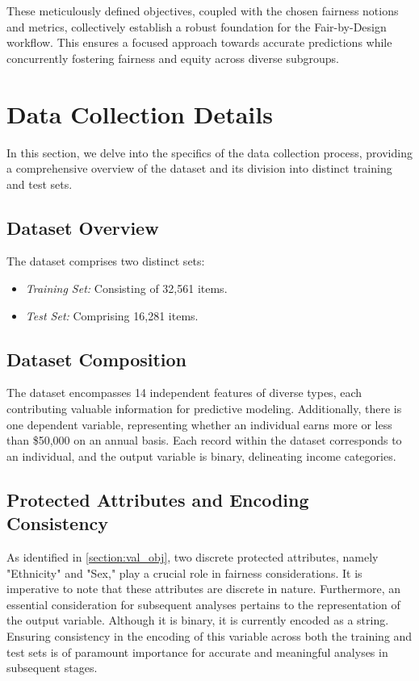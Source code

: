These meticulously defined objectives, coupled with the chosen fairness notions and metrics, collectively establish a robust foundation for the Fair-by-Design workflow. This ensures a focused approach towards accurate predictions while concurrently fostering fairness and equity across diverse subgroups.

\section{Data Collection Details}
\label{section:val_dc}

In this section, we delve into the specifics of the data collection process, providing a comprehensive overview of the dataset and its division into distinct training and test sets.

\subsection{Dataset Overview}

The dataset comprises two distinct sets:

\begin{itemize}
    \item \emph{Training Set:} Consisting of 32,561 items.
    \item \emph{Test Set:} Comprising 16,281 items.
\end{itemize}

\subsection{Dataset Composition}

The dataset encompasses 14 independent features of diverse types, each contributing valuable information for predictive modeling. Additionally, there is one dependent variable, representing whether an individual earns more or less than \$50,000 on an annual basis. Each record within the dataset corresponds to an individual, and the output variable is binary, delineating income categories.

\subsection{Protected Attributes and Encoding Consistency}

As identified in \cref{section:val_obj}, two discrete protected attributes, namely "Ethnicity" and "Sex," play a crucial role in fairness considerations. It is imperative to note that these attributes are discrete in nature. Furthermore, an essential consideration for subsequent analyses pertains to the representation of the output variable. Although it is binary, it is currently encoded as a string. Ensuring consistency in the encoding of this variable across both the training and test sets is of paramount importance for accurate and meaningful analyses in subsequent stages.

